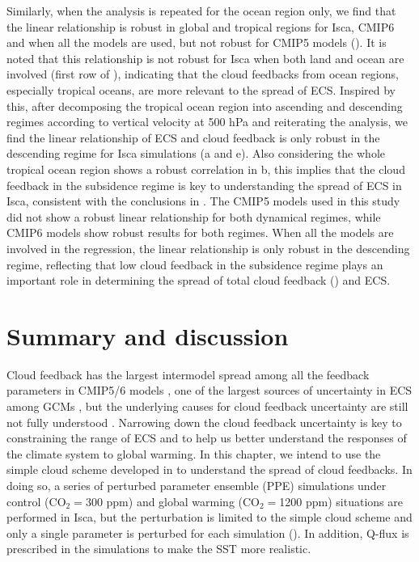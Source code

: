 Similarly, when the analysis is repeated for the ocean region only, we find that the linear relationship is robust in global and tropical regions for Isca, CMIP6 and when all the models are used, but not robust for CMIP5 models (). It is noted that this relationship is not robust for Isca when both land and ocean are involved (first row of ), indicating that the cloud feedbacks from ocean regions, especially tropical oceans, are more relevant to the spread of ECS. Inspired by this, after decomposing the tropical ocean region into ascending and descending regimes according to vertical velocity at 500 hPa \citep{Bony2004,Bony2005} and reiterating the analysis, we find the linear relationship of ECS and cloud feedback is only robust in the descending regime for Isca simulations (a and e). Also considering the whole tropical ocean region shows a robust correlation in b, this implies that the cloud feedback in the subsidence regime is key to understanding the spread of ECS in Isca, consistent with the conclusions in . The CMIP5 models used in this study did not show a robust linear relationship for both dynamical regimes, while CMIP6 models show robust results for both regimes. When all the models are involved in the regression, the linear relationship is only robust in the descending regime, reflecting that low cloud feedback in the subsidence regime plays an important role in determining the spread of total cloud feedback () and ECS.


\section{Summary and discussion}

Cloud feedback has the largest intermodel spread among all the feedback parameters in CMIP5/6 models \citep{Zelinka2020causes}, one of the largest sources of uncertainty in ECS among GCMs \citep{Stocker2013,Ceppi2017,Zelinka2020causes}, but the underlying causes for cloud feedback uncertainty are still not fully understood \citep[e.g.,][]{Bony2005,Vial2013,Qu2014,Qu2015positive,Webb2015,Zelinka2016insights,Geoffroy2017,Zelinka2020causes}. Narrowing down the cloud feedback uncertainty is key to constraining the range of ECS \citep[e.g.,][]{Myers2021,Ceppi2021observational} and to help us better understand the responses of the climate system to global warming. In this chapter, we intend to use the simple cloud scheme developed in  to understand the spread of cloud feedbacks. In doing so, a series of perturbed parameter ensemble (PPE) simulations under control (CO$_2=$300 ppm) and global warming (CO$_2=$1200 ppm) situations are performed in Isca, but the perturbation is limited to the simple cloud scheme and only a single parameter is perturbed for each simulation (). In addition, Q-flux is prescribed in the simulations to make the SST more realistic.

